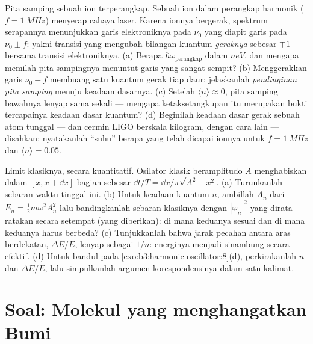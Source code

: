 \begin{exercise}[$\star\star\star$]\label{exo:b3:harmonic-oscillator:11}
Pita samping sebuah ion terperangkap. Sebuah ion dalam perangkap
harmonik ($f =
\qty{1}{MHz}$) menyerap cahaya laser. Karena ionnya
bergerak, spektrum serapannya menunjukkan garis elektroniknya pada
$\nu_0$ yang diapit garis pada $\nu_0 \pm f$: yakni transisi yang
mengubah bilangan kuantum \emph{geraknya} sebesar $\mp1$ bersama
transisi elektroniknya. (a) Berapa
$\hbar\omega_{\text{perangkap}}$ dalam $\unit{neV}$, dan mengapa memilah
pita sampingnya menuntut garis yang sangat sempit? (b) Menggerakkan
garis $\nu_0 - f$ membuang satu kuantum gerak tiap daur: jelaskanlah
\emph{pendinginan pita samping} menuju keadaan dasarnya. (c) Setelah
$\langle n\rangle \approx
0$, pita samping bawahnya lenyap sama sekali --- mengapa
ketaksetangkupan itu merupakan bukti tercapainya keadaan dasar kuantum?
(d) Beginilah keadaan dasar gerak sebuah atom tunggal --- dan cermin
LIGO berskala kilogram, dengan cara lain --- disahkan: nyatakanlah
``suhu'' berapa yang telah dicapai ionnya untuk $f = \qty{1}{MHz}$ dan
$\langle n\rangle = 0.05$.
\end{exercise}

\begin{exercise}[$\star\star\star$]\label{exo:b3:harmonic-oscillator:12}
Limit klasiknya, secara kuantitatif. Osilator klasik beramplitudo
$A$ menghabiskan dalam $[x, x + \dd x]$ bagian sebesar $\dd
t/T = \dd x/\pi\sqrt{A^2 - x^2}$. (a) Turunkanlah sebaran waktu tinggal
ini. (b) Untuk keadaan kuantum $n$, ambillah $A_n$ dari $E_n =
\tfrac12 m\omega^2A_n^2$ lalu bandingkanlah sebaran klasiknya dengan
$|\varphi_n|^2$ yang dirata-ratakan secara setempat (yang diberikan): di
mana keduanya sesuai dan di mana keduanya harus berbeda? (c)
Tunjukkanlah bahwa jarak pecahan antara aras berdekatan, $\Delta E/E$,
lenyap sebagai $1/n$: energinya menjadi sinambung secara efektif. (d)
Untuk bandul pada \cref{exo:b3:harmonic-oscillator:8}(d),
perkirakanlah $n$ dan $\Delta
E/E$, lalu simpulkanlah argumen korespondensinya dalam satu kalimat.
\end{exercise}

\section{Soal: Molekul yang menghangatkan Bumi}

